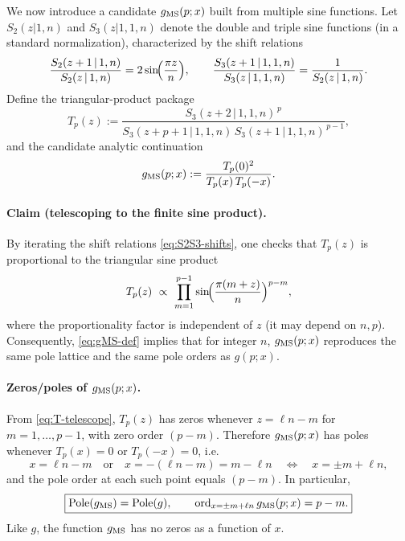 \documentclass[11pt]{article}
\begin{document}
{  We now introduce a candidate $g_{\rm MS}(p;x)$ built from multiple sine
  functions. Let $S_{2}(z|1,n)$ and $S_{3}(z|1,1,n)$ denote the double and triple
  sine functions (in a standard normalization), characterized by the shift
  relations
  \begin{equation}
    \frac{S_{2}(z+1\,|\,1,n)}{S_{2}(z\,|\,1,n)}=2\sin\!\Bigl(\frac{\pi z}{n}\Bigr
    ), \qquad \frac{S_{3}(z+1\,|\,1,1,n)}{S_{3}(z\,|\,1,1,n)}=\frac{1}{S_{2}(z\,|\,1,n)}
    . \label{eq:S2S3-shifts}
  \end{equation}
  Define the triangular-product package
  \begin{equation}
    T_{p}(z):= \frac{S_{3}(z+2\,|\,1,1,n)^{\,p}}{S_{3}(z+p+1\,|\,1,1,n)\,S_{3}(z+1\,|\,1,1,n)^{\,p-1}}
    , \label{eq:T-def}
  \end{equation}
  and the candidate analytic continuation
  \begin{equation}
    g_{\rm MS}(p;x):=\frac{T_{p}(0)^{2}}{T_{p}(x)\,T_{p}(-x)}. \label{eq:gMS-def}
  \end{equation}

  \paragraph{Claim (telescoping to the finite sine product).}
  By iterating the shift relations \eqref{eq:S2S3-shifts}, one checks that
  $T_{p}(z)$ is proportional to the triangular sine product
  \begin{equation}
    T_{p}(z)\ \propto\ \prod_{m=1}^{p-1}\sin\!\Bigl(\frac{\pi(m+z)}{n}\Bigr)^{p-m}
    , \label{eq:T-telescope}
  \end{equation}
  where the proportionality factor is independent of $z$ (it may depend on $n,p$).
  Consequently, \eqref{eq:gMS-def} implies that for integer $n$,
  $g_{\rm MS}(p;x)$ reproduces the same pole lattice and the same pole orders as
  $g(p;x)$.

  \paragraph{Zeros/poles of $g_{\rm MS}(p;x)$.}
  From \eqref{eq:T-telescope}, $T_{p}(z)$ has zeros whenever $z=\ell n-m$ for $m=
  1,\dots,p-1$, with zero order $(p-m)$. Therefore $g_{\rm MS}(p;x)$ has poles whenever
  $T_{p}(x)=0$ or $T_{p}(-x)=0$, i.e.
  \begin{equation}
    x=\ell n-m\quad \text{or}\quad x=-(\ell n-m)=m-\ell n \quad\Longleftrightarrow
    \quad x=\pm m+\ell n,
  \end{equation}
  and the pole order at each such point equals $(p-m)$. In particular,
  \begin{equation}
    \boxed{ \mathrm{Pole}(g_{\rm MS})=\mathrm{Pole}(g),\qquad \mathrm{ord}_{x=\pm m+\ell n}\,g_{\rm MS}(p;x)=p-m. }
  \end{equation}
  Like $g$, the function $g_{\rm MS}$ has no zeros as a function of $x$.

}
\end{document}
